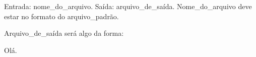 \documentclass[a4paper, 12pt]{article}
\begin{document}
Entrada: nome\_do\_arquivo.
Saída: arquivo\_de\_saída.
Nome\_do\_arquivo deve estar no formato do arquivo\_padrão.

Arquivo\_de\_saída será algo da forma:

Olá.
\end{document}
